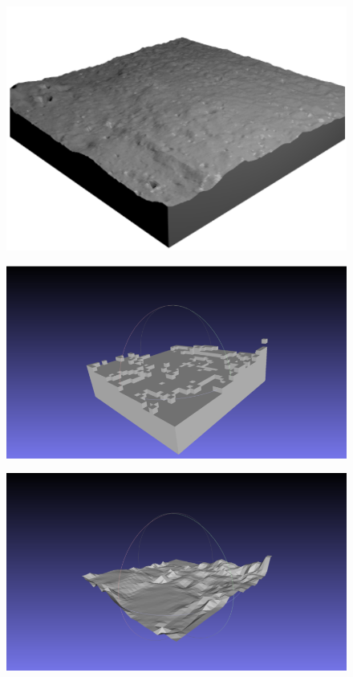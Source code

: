 \documentclass[a4paper,twocolumn,9pt]{jsarticle}
\begin{document}
\begin{figure}[b]
  \centering
  \begin{minipage}[b]{0.4\linewidth}
    \centering
    \includegraphics[keepaspectratio, scale=0.1]{figures/NASA_moon.png}
    \label{fig:moon_nasa}
  \end{minipage}
  \begin{minipage}[b]{0.4\linewidth}
    \centering
    \includegraphics[keepaspectratio, scale=0.1]{figures/moon_voxel.png}
    \label{fig:moon_voxel}
  \end{minipage}
  \begin{minipage}[b]{0.4\linewidth}
    \centering
    \includegraphics[keepaspectratio, scale=0.1]{figures/moon_mesh.png}

\end{minipage}
\end{figure}
\end{document}
